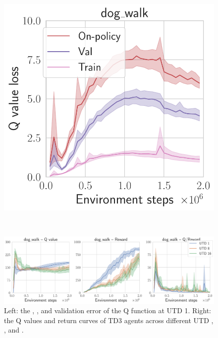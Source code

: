 % 
% 
\begin{figure}[t]
\begin{minipage}{0.25\textwidth}
    \includegraphics[width=\textwidth]{figures/mad-td/critic_loss_dog_walk.pdf}
\end{minipage}
~
\begin{minipage}{0.745\textwidth}
    \includegraphics[width=\textwidth]{figures/mad-td/q_overestimation.pdf}
\end{minipage}
\caption{Left: the , , and  validation error of the Q function at UTD 1. Right: the Q values and return curves of TD3 agents across different UTD , , and .}
\label{fig:mad:q_eval}
\end{figure}

